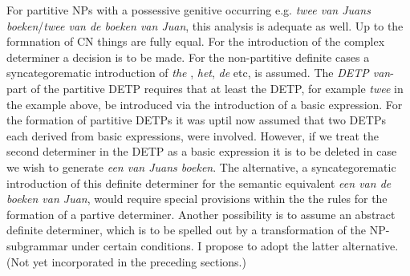 For partitive NPs with a possessive genitive occurring e.g. {\em twee van Juans
boeken}/{\em twee van de boeken van Juan}, this analysis is adequate as well.
Up to the formnation of CN things are fully equal. For the introduction of the
complex determiner a decision is to be made. For the non-partitive definite
cases a syncategorematic introduction of {\em the }, {\em het}, {\em de} etc,
is assumed. The {\em DETP van}-part of the partitive DETP requires that at
least the DETP, for example {\em twee} in the example above, be introduced via
the introduction of a basic expression. For the formation of partitive DETPs it
was uptil now assumed that two DETPs each derived from basic expressions, were
involved. However, if we treat the second determiner in the DETP as a basic
expression it is to be deleted in case we wish to generate {\em een van Juans
boeken}. The alternative, a syncategorematic introduction of this definite
determiner for the semantic equivalent {\em een van de boeken van Juan}, would
require special provisions within the the rules for the formation of a partive
determiner.  Another possibility is to assume an abstract definite determiner,
which is to be spelled out by a transformation of the NP-subgrammar under
certain conditions. I propose to adopt the latter alternative. (Not yet
incorporated in the preceding sections.)\\ \\

